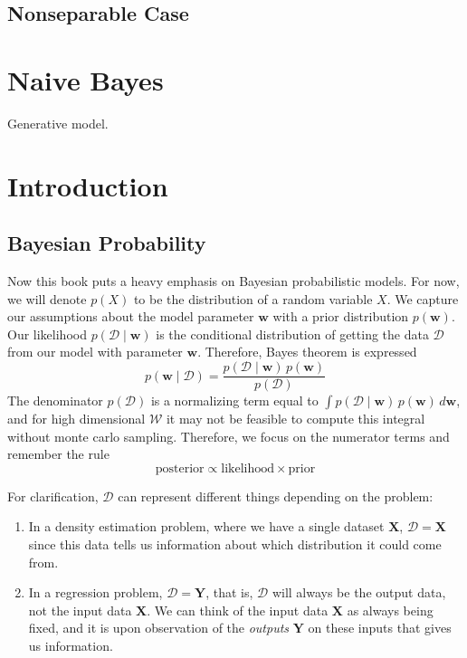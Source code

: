 \documentclass{article}
\theoremstyle{definition}
\theoremstyle{remark}
\theoremstyle{definition}
\begin{document}
\subsection{Nonseparable Case} 

\section{Naive Bayes}

Generative model. 




\section{Introduction}

\subsection{Bayesian Probability}

Now this book puts a heavy emphasis on Bayesian probabilistic models. For now, we will denote $p(X)$ to be the distribution of a random variable $X$. We capture our assumptions about the model parameter $\mathbf{w}$ with a prior distribution $p(\mathbf{w})$. Our likelihood $p(\mathcal{D} \mid \mathbf{w})$ is the conditional distribution of getting the data $\mathcal{D}$ from our model with parameter $\mathbf{w}$. Therefore, Bayes theorem is expressed 
\[p(\mathbf{w} \mid \mathcal{D}) = \frac{p(\mathcal{D} \mid \mathbf{w}) \, p(\mathbf{w})}{p(\mathcal{D})}\]
The denominator $p(\mathcal{D})$ is a normalizing term equal to $\int p(\mathcal{D} \mid \mathbf{w}) \, p(\mathbf{w}) \,d\mathbf{w}$, and for high dimensional $\mathcal{W}$ it may not be feasible to compute this integral without monte carlo sampling. Therefore, we focus on the numerator terms and remember the rule 
\[\text{posterior} \propto \text{likelihood} \times \text{prior}\]

For clarification, $\mathcal{D}$ can represent different things depending on the problem: 
\begin{enumerate}
    \item In a density estimation problem, where we have a single dataset $\mathbf{X}$, $\mathcal{D} = \mathbf{X}$ since this data tells us information about which distribution it could come from. 
    \item In a regression problem, $\mathcal{D} = \mathbf{Y}$, that is, $\mathcal{D}$ will always be the output data, not the input data $\mathbf{X}$. We can think of the input data $\mathbf{X}$ as always being fixed, and it is upon observation of the \textit{outputs} $\mathbf{Y}$ on these inputs that gives us information. 
\end{enumerate}
\end{document}
